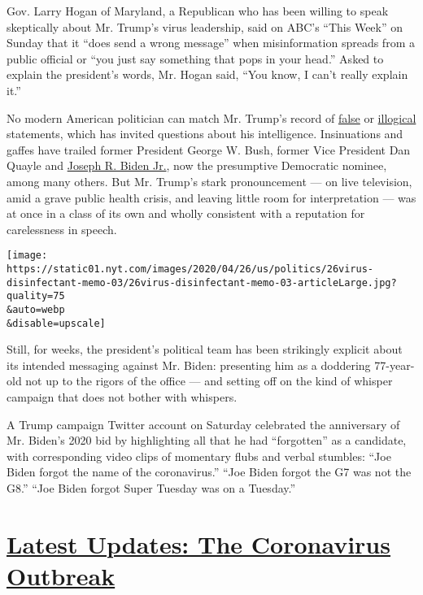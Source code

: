 Gov. Larry Hogan of Maryland, a Republican who has been willing to speak
skeptically about Mr. Trump's virus leadership, said on ABC's ``This
Week'' on Sunday that it ``does send a wrong message'' when
misinformation spreads from a public official or ``you just say
something that pops in your head.'' Asked to explain the president's
words, Mr. Hogan said, ``You know, I can't really explain it.''

No modern American politician can match Mr. Trump's record of
\href{https://www.nytimes.com/spotlight/fact-checks}{false} or
\href{https://www.nytimes.com/interactive/2019/11/02/us/politics/trump-twitter-presidency.html}{illogical}
statements, which has invited questions about his intelligence.
Insinuations and gaffes have trailed former President George W. Bush,
former Vice President Dan Quayle and
\href{https://www.nytimes.com/interactive/2020/us/elections/joe-biden.html}{Joseph
R. Biden Jr.}, now the presumptive Democratic nominee, among many
others. But Mr. Trump's stark pronouncement --- on live television, amid
a grave public health crisis, and leaving little room for interpretation
--- was at once in a class of its own and wholly consistent with a
reputation for carelessness in speech.

\texttt{[image: https://static01.nyt.com/images/2020/04/26/us/politics/26virus-disinfectant-memo-03/26virus-disinfectant-memo-03-articleLarge.jpg?quality=75\\\&auto=webp\\\&disable=upscale]}

Still, for weeks, the president's political team has been strikingly
explicit about its intended messaging against Mr. Biden: presenting him
as a doddering 77-year-old not up to the rigors of the office --- and
setting off on the kind of whisper campaign that does not bother with
whispers.

A Trump campaign Twitter account on Saturday celebrated the anniversary
of Mr. Biden's 2020 bid by highlighting all that he had ``forgotten'' as
a candidate, with corresponding video clips of momentary flubs and
verbal stumbles: ``Joe Biden forgot the name of the coronavirus.'' ``Joe
Biden forgot the G7 was not the G8.'' ``Joe Biden forgot Super Tuesday
was on a Tuesday.''

\hypertarget{latest-updates-the-coronavirus-outbreak}{%
\section{\texorpdfstring{\href{https://www.nytimes.com/2020/08/07/world/covid-19-news.html?action=click\&pgtype=Article\&state=default\&region=MAIN_CONTENT_1\&context=storylines_live_updates}{Latest
Updates: The Coronavirus
Outbreak}}{Latest Updates: The Coronavirus Outbreak}}\label{latest-updates-the-coronavirus-outbreak}}

